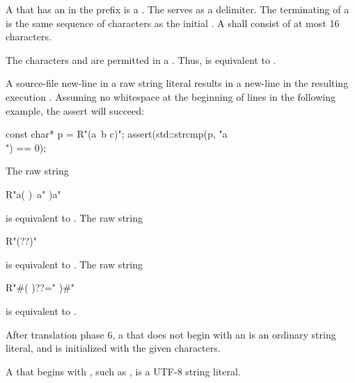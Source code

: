 \pnum
A  that has an  in the prefix is a . The
 serves as a delimiter. The terminating
 of a  is the same sequence of
characters as the initial . A 
shall consist of at most 16 characters.

\pnum
\enternote The characters  and  are permitted in a
. Thus,  is equivalent to
. \exitnote

\pnum
\enternote A source-file new-line in a raw string literal results in a new-line in the
resulting execution . Assuming no
whitespace at the beginning of lines in the following example, the assert will succeed:

\begin{codeblock}
const char* p = R"(a\
b
c)";
assert(std::strcmp(p, "a\\\nb\nc") == 0);
\end{codeblock}
\exitnote

\pnum
\enterexample The raw string

\begin{codeblock}
R"a(
)\
a"
)a"
\end{codeblock}

is equivalent to . The raw string

\begin{codeblock}
R"(??)"
\end{codeblock}

is equivalent to . The raw string

\begin{codeblock}
R"#(
)??="
)#"
\end{codeblock}

is equivalent to . \exitexample

\pnum
{}%
%
After translation phase 6, a  that does not begin with an  is an ordinary string literal, and is initialized with the given characters.

\pnum
A  that begins with , such as , is a UTF-8 string literal.

